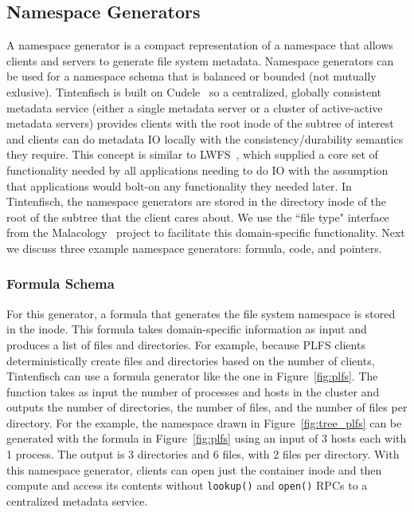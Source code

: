 \subsection{Namespace Generators}
\label{sec:namespace-generators}

A namespace generator is a compact representation of a namespace that allows
clients and servers to generate file system metadata.  Namespace generators can
be used for a namespace schema that is balanced or bounded (not mutually
exlusive).  Tintenfisch is built on Cudele~\cite{sevilla:ipdps18-cudele} so a
centralized, globally consistent metadata service (either a single metadata
server or a cluster of active-active metadata servers) provides clients with
the root inode of the subtree of interest and clients can do metadata IO
locally with the consistency/durability semantics they require. This concept is
similar to LWFS~\cite{oldfield:cc06-lwfs}, which supplied a core set of
functionality needed by all applications needing to do IO with the assumption
that applications would bolt-on any functionality they needed later.  In Tintenfisch,
the namespace generators are stored in the directory inode of the root of the
subtree that the client cares about. We use the ``file type" interface from the
Malacology~\cite{sevilla:eurosys17-malacology} project to facilitate this
domain-specific functionality.  Next we discuss three example namespace
generators: formula, code, and pointers.


\subsubsection{Formula Schema} 

For this generator, a formula that generates the file system namespace is stored
in the inode. This formula takes domain-specific information as input and
produces a list of files and directories.  For example, because PLFS clients
deterministically create files and directories based on the number of clients,
Tintenfisch can use a formula generator like the one in Figure~\ref{fig:plfs}. The
function takes as input the number of processes and hosts in the cluster and
outputs the number of directories, the number of files, and the number of files
per directory.  For the example, the namespace drawn in
Figure~\ref{fig:tree_plfs} can be generated with the formula in
Figure~\ref{fig:plfs} using an input of 3 hosts each with 1 process. The output
is 3 directories and 6 files, with 2 files per directory.  With this namespace
generator, clients can open just the container inode and then compute and access
its contents without \texttt{lookup()} and \texttt{open()} RPCs to a
centralized metadata service.

